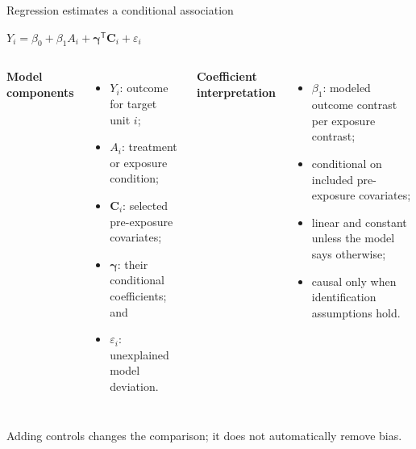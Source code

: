 \documentclass[10pt,aspectratio=169]{beamer}
\begin{document}
\begin{frame}{Regression estimates a conditional association}

\small

\begin{center}
\Large
$Y_i = \beta_0 + \beta_1 A_i + \boldsymbol{\gamma}^{\mathsf T}\mathbf{C}_i + \varepsilon_i$
\end{center}

\vspace{0.25cm}

\begin{columns}[T]


\textbf{Model components}

\begin{itemize}
  \item $Y_i$: outcome for target unit $i$;
  \item $A_i$: treatment or exposure condition;
  \item $\mathbf{C}_i$: selected pre-exposure covariates;
  \item $\boldsymbol{\gamma}$: their conditional coefficients; and
  \item $\varepsilon_i$: unexplained model deviation.
\end{itemize}


\textbf{Coefficient interpretation}

\begin{itemize}
  \item $\beta_1$: modeled outcome contrast per exposure contrast;
  \item conditional on included pre-exposure covariates;
  \item linear and constant unless the model says otherwise;
  \item causal only when identification assumptions hold.
\end{itemize}

\end{columns}

\vspace{0.20cm}

\centering
\textcolor{ukudlaRed}{Adding controls changes the comparison; it does not automatically remove bias.}

\end{frame}
\end{document}
